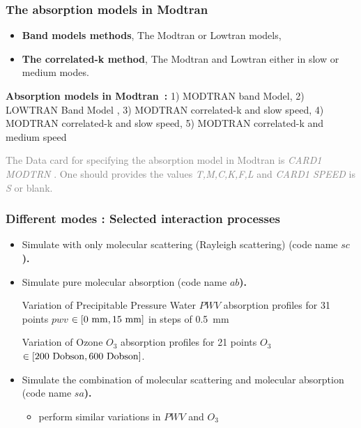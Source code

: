 \documentclass{beamer}
\begin{document}
\begin{frame}
\frametitle{The absorption models  in Modtran}

\begin{itemize}
\item {\bf Band models methods}, The Modtran or Lowtran models,
\item {\bf The correlated-k method}, The Modtran and Lowtran either in slow or medium modes.
\end{itemize} 

\begin{block} {\bf Absorption models in Modtran~:} 
1) MODTRAN band Model, 2) LOWTRAN Band Model ,  3) MODTRAN correlated-k  and slow speed,  4) MODTRAN correlated-k  and slow speed, 5) MODTRAN correlated-k  and medium speed
\end{block}

\textcolor{gray}{The Data card for specifying the absorption model in Modtran is  \textit{CARD1 MODTRN } . One should provides the values \textit{T,M,C,K,F,L} and \textit{CARD1 SPEED} is \textit{S} or blank. }
\end{frame}




\begin{frame}
\frametitle{Different modes : Selected interaction processes}
\begin{itemize}
\item Simulate with only molecular scattering (Rayleigh scattering) (code name \bf{$sc$}). 
\item Simulate pure molecular absorption (code name \bf{$ab$}).
\begin{block}{Variation of Precipitable Pressure Water $PWV$}
 absorption profiles  for 31 points $pwv$ $\in \left[0~{\rm mm},15~{\rm mm} \right]$ in steps of 0.5~mm\end{block}
 \begin{block}{Variation of Ozone $O_3$}
 absorption profiles for  21 points $O_3$ $\in \left[200~{\rm Dobson},600~{\rm Dobson} \right]$.
\end{block}
\item Simulate the combination of molecular scattering and molecular absorption (code name \bf{$sa$}). 
\begin{itemize}
\item perform similar variations in $PWV$ and $O_3$
\end{itemize}
\end{itemize} 
\end{frame}
\end{document}
